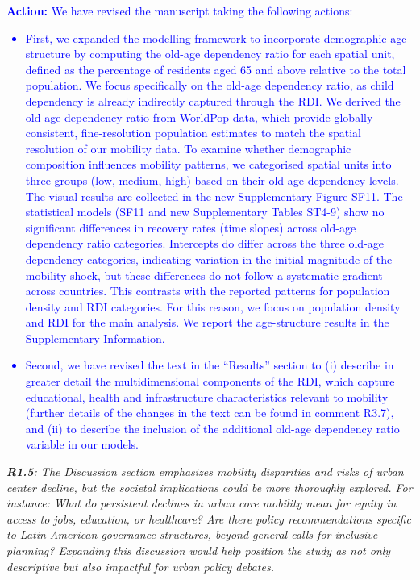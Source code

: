 \documentclass[12pt,a4paper,oneside, reqno]{amsart}
\begin{document}
\textcolor{blue}{
\textbf{Action:} We have revised the manuscript taking the following actions:
\begin{itemize}[noitemsep, topsep=0pt]
    \item First, we expanded the modelling framework to incorporate demographic age structure by computing the old-age dependency ratio for each spatial unit, defined as the percentage of residents aged 65 and above relative to the total population. We focus specifically on the old-age dependency ratio, as child dependency is already indirectly captured through the RDI. We derived the old-age dependency ratio from WorldPop data, which provide globally consistent, fine-resolution population estimates to match the spatial resolution of our mobility data. To examine whether demographic composition influences mobility patterns, we categorised spatial units into three groups (low, medium, high) based on their old-age dependency levels. The visual results are collected in the new Supplementary Figure SF11. The statistical models (SF11 and new Supplementary Tables ST4-9) show no significant differences in recovery rates (time slopes) across old-age dependency ratio categories. Intercepts do differ across the three old-age dependency categories, indicating variation in the initial magnitude of the mobility shock, but these differences do not follow a systematic gradient across countries. This contrasts with the reported patterns for population density and RDI categories. For this reason, we focus on population density and RDI for the main analysis. We report the age-structure results in the Supplementary Information.
    \item Second, we have revised the text in the ``Results'' section to (i) describe in greater detail the multidimensional components of the RDI, which capture educational, health and infrastructure characteristics relevant to mobility (further details of the changes in the text can be found in comment R3.7), and (ii) to describe the inclusion of the additional old-age dependency ratio variable in our models.
\end{itemize}
}

\setlength{\leftskip}{0cm} \textit{\textbf{R1.5}: The Discussion section emphasizes mobility disparities and risks of urban center decline, but the societal implications could be more thoroughly explored. For instance: What do persistent declines in urban core mobility mean for equity in access to jobs, education, or healthcare? Are there policy recommendations specific to Latin American governance structures, beyond general calls for inclusive planning? Expanding this discussion would help position the study as not only descriptive but also impactful for urban policy debates.
}
\end{document}
